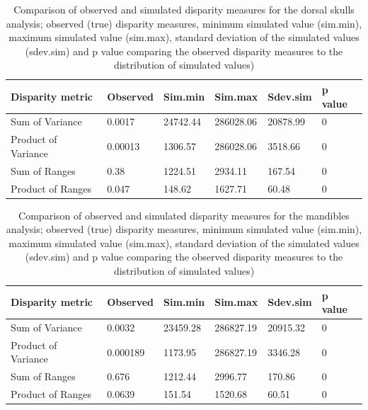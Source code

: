 \documentclass[12pt,a4paper]{article}
\begin{document}
\begin{table}[H]				%

\centering
\caption{Comparison of observed and simulated disparity measures for the dorsal skulls analysis; observed (true) disparity measures, minimum simulated value (sim.min), maximum simulated value (sim.max), standard deviation of the simulated values (sdev.sim) and p value comparing the observed disparity measures to the distribution of simulated values)}

\begin{tabular}[t]{l l l l l l }		%
\hline
\textbf{Disparity metric} & \textbf{Observed} & \textbf{Sim.min} & \textbf{Sim.max} & \textbf{Sdev.sim} & \textbf{p value} \\
\hline
Sum of Variance & 0.0017 & 24742.44 & 286028.06 & 20878.99 &	0\\
Product of Variance	& 0.00013 &	1306.57 &	286028.06 &	3518.66 & 0\\
Sum of Ranges &	0.38 &	1224.51 &	2934.11 &	167.54 & 0 \\
Product of Ranges & 0.047 &	148.62 & 1627.71 &	60.48 &	0\\
\hline
\end{tabular}
\label{skdorssims} %
\end{table}

\begin{table}[H]				

\centering
\caption{Comparison of observed and simulated disparity measures for the mandibles analysis; observed (true) disparity measures, minimum simulated value (sim.min), maximum simulated value (sim.max), standard deviation of the simulated values (sdev.sim) and p value comparing the observed disparity measures to the distribution of simulated values)}

\begin{tabular}[t]{l l l l l l }		%
\hline
\textbf{Disparity metric} & \textbf{Observed} & \textbf{Sim.min} & \textbf{Sim.max} & \textbf{Sdev.sim} & \textbf{p value} \\
\hline
Sum of Variance & 0.0032 & 23459.28 & 286827.19 & 20915.32 &	0\\
Product of Variance	& 0.000189 & 1173.95 &	286827.19 &	3346.28 & 0\\
Sum of Ranges &	0.676 &	1212.44 &	2996.77 &	170.86 & 0 \\
Product of Ranges & 0.0639 & 151.54 & 1520.68 &	60.51 &	0\\
\hline
\end{tabular}
\label{mandssims}
\end{table}
\end{document}
